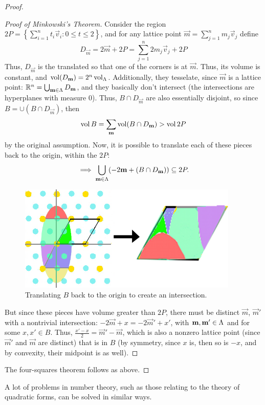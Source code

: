 \begin{proof}
\begin{proof}[Proof of Minkowski's Theorem]
Consider the region $2P = \left\{\sum_{i=1}^n t_i\vec v_i: 0\le t \le 2\right\}$, and for any lattice point $\vec m = \sum_{j=1}^n m_j\vec v_j$ define
\[D_{\vec m} = 2\vec m +2P = \sum_{j=1}^n 2m_j\vec v_j +2P\]
Thus, $D_{\vec m}$ is the \ptope{} translated so that one of the corners is at $\vec m$. Thus, its volume is constant, and $\operatorname{vol}(D_{\mathbf m}) = 2^n\operatorname{vol}_\Lambda$. Additionally, they tesselate, since $\vec m$ is a lattice point: $\mathbb{R}^n = \bigcup_{\mathbf m\in\Lambda} D_{\mathbf m}$, and they basically don't intersect (the intersections are hyperplanes with measure 0). Thus, $B\cap D_{\vec m}$ are also essentially disjoint, so since $B = \cup(B\cap D_{\vec m})$, then
\[\operatorname{vol} B = \sum_{\mathbf m}\operatorname{vol}(B\cap D_{\mathbf m}) > \operatorname{vol} 2P\]
by the original assumption. Now, it is possible to translate each of these pieces back to the origin, within the \ptope{} $2P$:
\[\implies \bigcup_{\mathbf m\in\Lambda}(-2\mathbf m +(B\cap D_{\mathbf m})) \subseteq 2P.\]
\begin{figure}[h]
\centering
\includegraphics[height=2in]{lattice2}
\caption{Translating $B$ back to the origin to create an intersection.}
\end{figure}
But since these pieces have volume greater than $2P$, there must be distinct $\vec m$, $\vec m'$ with a nontrivial intersection: $-2\vec m + x = -2\vec m' + x'$, with $\mathbf m,\mathbf m'\in\Lambda$ and for some $x,x'\in B$. Thus, $\frac{x'-x}{2} = \vec m'-\vec m$, which is also a nonzero lattice point (since $\vec m'$ and $\vec m$ are distinct) that is in $B$ (by symmetry, since $x$ is, then so is $-x$, and by convexity, their midpoint is as well).
\end{proof}
The four-squares theorem follows as above.
\end{proof}
A lot of problems in number theory, such as those relating to the theory of quadratic forms, can be solved in similar ways.
